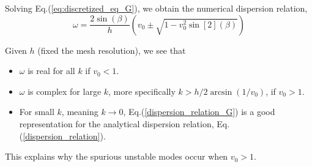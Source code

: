 Solving Eq.(\ref{eq:discretized_eq_G}), we obtain the numerical dispersion relation,
\begin{equation} \label{dispersion_relation_G}
	\omega = \frac{2\sin(\beta)}{h}\left(v_0 \pm \sqrt{1 - v_0^2\sin[2](\beta)}\right)
\end{equation}

Given $h$ (fixed the mesh resolution), we see that
\begin{itemize}
	\item $\omega$ is real for all $k$ if $v_0 < 1$.
	\item $\omega$ is complex for large $k$, more specifically $k>h/2\arcsin(1/v_0)$, if $v_0 > 1$.
	\item For small $k$, meaning $k\to 0$, Eq.(\ref{dispersion_relation_G}) is a good representation for the analytical dispersion relation, Eq.(\ref{dispersion_relation}). 
\end{itemize}
This explains why the spurious unstable modes occur when $v_0>1$.

